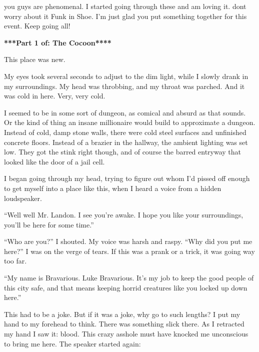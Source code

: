 

you guys are phenomenal. I started going through these and am
loving it. dont worry about it Funk in Shoe. I'm just glad you put
something together for this event. Keep going all! 

 





{\bf ****Part 1 of: The Cocoon****}



This place was new.



My eyes took several seconds to adjust to the dim light, while I
slowly drank in my surroundings. My head was throbbing, and my
throat was parched. And it was cold in here. Very, very cold.



I seemed to be in some sort of dungeon, as comical and absurd as
that sounds. Or the kind of thing an insane millionaire would build
to approximate a dungeon. Instead of cold, damp stone walls, there
were cold steel surfaces and unfinished concrete floors. Instead of
a brazier in the hallway, the ambient lighting was set low. They
got the stink right though, and of course the barred entryway that
looked like the door of a jail cell.



I began going through my head, trying to figure out whom I'd
pissed off enough to get myself into a place like this, when I
heard a voice from a hidden loudspeaker.



``Well well Mr. Landon. I see you're awake. I hope you
like your surroundings, you'll be here for some
time.''



``Who are you?'' I shouted. My voice was harsh and raspy.
``Why did you put me here?'' I was on the verge of tears.
If this was a prank or a trick, it was going way too far.



``My name is Bravarious. Luke Bravarious. It's my job to
keep the good people of this city safe, and that means keeping
horrid creatures like you locked up down here.''



This had to be a joke. But if it was a joke, why go to such
lengths? I put my hand to my forehead to think. There was something
slick there. As I retracted my hand I saw it: blood. This crazy
asshole must have knocked me unconscious to bring me here. The
speaker started again:



